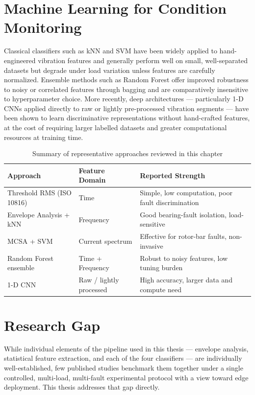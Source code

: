 \documentclass[12pt,a4paper]{report}
\begin{document}
\section{Machine Learning for Condition Monitoring}
Classical classifiers such as kNN and SVM have been widely applied to hand-engineered vibration
features and generally perform well on small, well-separated datasets but degrade under load
variation unless features are carefully normalized. Ensemble methods such as Random Forest offer
improved robustness to noisy or correlated features through bagging and are comparatively
insensitive to hyperparameter choice. More recently, deep architectures --- particularly 1-D
CNNs applied directly to raw or lightly pre-processed vibration segments --- have been shown to
learn discriminative representations without hand-crafted features, at the cost of requiring
larger labelled datasets and greater computational resources at training time.

\begin{table}[!ht]
\centering
\caption{Summary of representative approaches reviewed in this chapter}
\label{tab:litsummary}
\begin{tabularx}{\textwidth}{@{}l l X@{}}
\toprule
\textbf{Approach} & \textbf{Feature Domain} & \textbf{Reported Strength} \\
\midrule
Threshold RMS (ISO 10816) & Time & Simple, low computation, poor fault discrimination \\
Envelope Analysis + kNN   & Frequency & Good bearing-fault isolation, load-sensitive \\
MCSA + SVM                & Current spectrum & Effective for rotor-bar faults, non-invasive \\
Random Forest ensemble    & Time + Frequency & Robust to noisy features, low tuning burden \\
1-D CNN                   & Raw / lightly processed & High accuracy, larger data and compute need \\
\bottomrule
\end{tabularx}
\end{table}

\section{Research Gap}
While individual elements of the pipeline used in this thesis --- envelope analysis,
statistical feature extraction, and each of the four classifiers --- are individually
well-established, few published studies benchmark them together under a single controlled,
multi-load, multi-fault experimental protocol with a view toward edge deployment. This thesis
addresses that gap directly.
\end{document}
